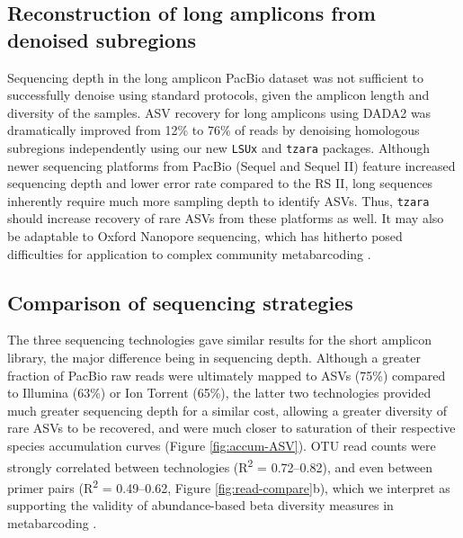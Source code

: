 \documentclass[
  12pt,
]{article}
\begin{document}
\hypertarget{reconstruction-of-long-amplicons-from-denoised-subregions}{%
\subsection{Reconstruction of long amplicons from denoised subregions}\label{reconstruction-of-long-amplicons-from-denoised-subregions}}

Sequencing depth in the long amplicon PacBio dataset was not sufficient to successfully denoise using standard protocols, given the amplicon length and diversity of the samples.
ASV recovery for long amplicons using DADA2 was dramatically improved from 12\% to 76\% of reads by denoising homologous subregions independently using our new \texttt{LSUx} and \texttt{tzara} packages.
Although newer sequencing platforms from PacBio (Sequel and Sequel II) feature increased sequencing depth and lower error rate compared to the RS II, long sequences inherently require much more sampling depth to identify ASVs.
Thus, \texttt{tzara} should increase recovery of rare ASVs from these platforms as well.
It may also be adaptable to Oxford Nanopore sequencing, which has hitherto posed difficulties for application to complex community metabarcoding \autocite{loit2019}.

\hypertarget{comparison-of-sequencing-strategies}{%
\subsection{Comparison of sequencing strategies}\label{comparison-of-sequencing-strategies}}

The three sequencing technologies gave similar results for the short amplicon library, the major difference being in sequencing depth.
Although a greater fraction of PacBio raw reads were ultimately mapped to ASVs (75\%) compared to Illumina (63\%) or Ion Torrent (65\%),
the latter two technologies provided much greater sequencing depth for a similar cost, allowing a greater diversity of rare ASVs to be recovered, and were much closer to saturation of their respective species accumulation curves (Figure \ref{fig:accum-ASV}).
OTU read counts were strongly correlated between technologies (R\textsuperscript{2} = 0.72--0.82),
and even between primer pairs (R\textsuperscript{2} = 0.49--0.62, Figure \ref{fig:read-compare}b),
which we interpret as supporting the validity of abundance-based beta diversity measures in metabarcoding \autocite[but see][ and references therein]{castano2020}.
\end{document}
